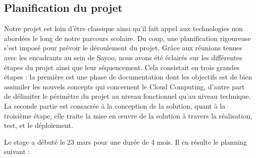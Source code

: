 \begin{onehalfspace}
\begin{itemize}
\section{Planification du projet}

Notre projet est loin d'être classique ainsi qu'il fait appel aux technologies non abordées le long de notre parcours scolaire. Du coup, une planification rigoureuse s'est imposé pour prévoir le déroulement du projet. Grâce aux réunions tenues avec les encadrants au sein de Sayoo, nous avons été éclairés sur les différentes étapes du projet ainsi que leur séquencement. Cela consistait en trois grandes étapes : la première est une phase de documentation dont les objectifs est de bien assimiler les nouvels concepts qui concernent le Cloud Computing, d'autre part de délimiter le périmètre du projet au niveau fonctionnel qu'au niveau technique. La seconde partie est consacrée à la conception de la solution, quant à la troisième étape, elle traite la mise en œuvre de la solution à travers la réalisation, test, et le déploiement.

Le stage a débuté le 23 mars pour une durée de 4 mois. Il en résulte le planning suivant :


\end{itemize}
\end{onehalfspace}
